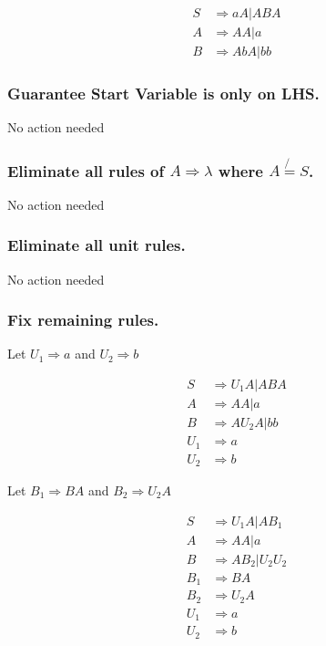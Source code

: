 \documentclass{article}
\begin{document}
\begin{align*}
    S & \Rightarrow aA|ABA \\
    A & \Rightarrow AA|a   \\
    B & \Rightarrow AbA|bb
\end{align*}

\subsubsection{Guarantee Start Variable is only on LHS.}

No action needed

\subsubsection{Eliminate all rules of $A \Rightarrow \lambda$ where $A \not{=} S$.}

No action needed

\subsubsection{Eliminate all unit rules.}

No action needed

\subsubsection{Fix remaining rules.}

Let $U_1 \Rightarrow a$ and $U_2 \Rightarrow b$

\begin{align*}
    S   & \Rightarrow U_1 A|ABA  \\
    A   & \Rightarrow AA|a       \\
    B   & \Rightarrow A U_2 A|bb \\
    U_1 & \Rightarrow a          \\
    U_2 & \Rightarrow b
\end{align*}

Let $B_1 \Rightarrow BA$ and $B_2 \Rightarrow U_2 A$

\begin{align*}
    S   & \Rightarrow U_1 A | A B_1   \\
    A   & \Rightarrow A A | a         \\
    B   & \Rightarrow A B_2 | U_2 U_2 \\
    B_1 & \Rightarrow B A             \\
    B_2 & \Rightarrow U_2 A           \\
    U_1 & \Rightarrow a               \\
    U_2 & \Rightarrow b
\end{align*}
\end{document}
